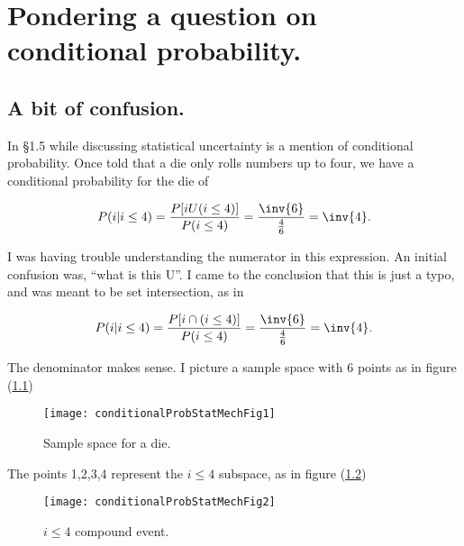 
%

\chapter{Pondering a question on conditional probability.}
\label{chap:conditionalProbStatMech}
{}
\date{Dec 27, 2011}

\beginArtNoToc

\section{A bit of confusion.}

In \cite{jackson2000equilibrium} \S 1.5 while discussing statistical uncertainty is a mention of conditional probability.  Once told that a die only rolls numbers up to four, we have a conditional probability for the die of

\begin{equation}\label{eqn:conditionalProbStatMech:10}
P(i | i \le 4) = 
\frac{P[i U(i \le 4)]}{P(i \le 4)}
= \frac{\inv{6}}{\frac{4}{6}} = \inv{4}.
\end{equation}

I was having trouble understanding the numerator in this expression.  An initial confusion was, ``what is this U''.  I came to the conclusion that this is just a typo, and was meant to be set intersection, as in

\begin{equation}\label{eqn:conditionalProbStatMech:30}
P(i | i \le 4) = 
\frac{P[i \cap (i \le 4)]}{P(i \le 4)}
= \frac{\inv{6}}{\frac{4}{6}} = \inv{4}.
\end{equation}

The denominator makes sense.  I picture a sample space with 6 points as in figure (\ref{fig:conditionalProbStatMechalProbStatMechFig1})
\begin{figure}[htp]
   \centering
   \texttt{[image: conditionalProbStatMechFig1]}
   \caption{Sample space for a die.}\label{fig:conditionalProbStatMechalProbStatMechFig1}
\end{figure}

The points 1,2,3,4 represent the $i \le 4$ subspace, as in figure (\ref{fig:conditionalProbStatMechalProbStatMechFig2})
\begin{figure}[htp]
   \centering
   \texttt{[image: conditionalProbStatMechFig2]}
   \caption{$i \le 4$ compound event.}\label{fig:conditionalProbStatMechalProbStatMechFig2}
\end{figure}

